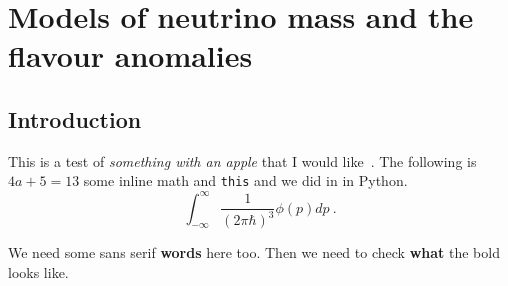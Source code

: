 \graphicspath{{img/chapter_5/}}

\chapter{Models of neutrino mass and the flavour anomalies}
\label{chapter:neutrino-mass-and-flavour-anomalies}

\section{Introduction}

This is a test of \textit{something with an apple} that I would like~\cite{Weinberg:1967tq}.
The following is $4a + 5 = 13$ some inline math and \texttt{this} and we did in in \textsf{Python}.
\begin{equation}
  \label{eq:1}
  \int_{-\infty}^{\infty} \frac{1}{(2\pi \hbar)^{3}} \phi(p) dp \ .
\end{equation}

\textsf{We need some sans serif \textbf{words} here too.} Then we need to check
\textbf{what} the bold looks like.

